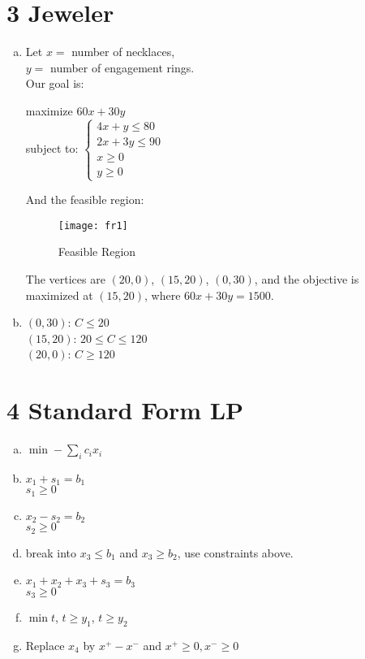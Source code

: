 \documentclass[11pt]{article}
\newenvironment{qparts}{\begin{enumerate}[(a)]}{\end{enumerate}}
\begin{document}
	\section*{3  Jeweler}
	\begin{qparts}
		\item 
		Let $x = $ number of necklaces, \\
		$y = $ number of engagement rings.\\
		Our goal is:
		\begin{center}
			maximize $60x+ 30y$\\
			subject to: $\begin{cases}
				4x+y \leq 80\\
				2x+3y \leq 90\\
				x \geq 0\\
				y \geq 0
			\end{cases}$
		\end{center}
		And the feasible region:
		
		\begin{figure}[h]
			\centering
			\texttt{[image: fr1]}
			\caption{Feasible Region}
		\end{figure}
			
		The vertices are $(20, 0)$, $(15, 20)$, $(0, 30)$, and the objective is maximized at $(15, 20)$, where $60x + 30y = 1500$.
		
		\item 
		$(0, 30)$: $C \leq 20$\\
		$(15, 20)$: $20 \leq C\leq 120$\\
		$(20, 0)$: $C \geq 120$
	\end{qparts}
	
	\section*{4  Standard Form LP}
	\begin{qparts}
		\item $\min -\sum_ic_ix_i$
		
		\item $x_1 + s_1 = b_1$\\
		$s_1 \geq 0$
		
		\item $x_2 - s_2 = b_2$\\
		$s_2 \geq 0$
		
		\item break into $x_3 \leq b_1$ and $x_3 \geq b_2$, use constraints above.
		
		\item $x_1 + x_2 + x_3 + s_3 = b_3$\\
		$s_3 \geq 0$
		
		\item $\min t$, $t \geq y_1$, $t \geq y_2$
		
		\item Replace $x_4$ by $x^+ - x^-$ and $x^+\geq 0, x^- \geq 0$ 
	\end{qparts}
\end{document}
